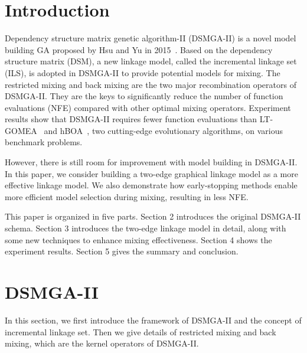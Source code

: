 \documentclass{sig-alternate-05-2015}
\begin{document}
%
%

%
%
\printccsdesc


\section{Introduction}

Dependency structure matrix genetic algorithm-II (DSMGA-II) is a novel model building GA proposed by Hsu and Yu in 2015~\cite{hsu:DSMGA2}.
Based on the dependency structure matrix (DSM), a new linkage model, called the incremental linkage set (ILS), is adopted in DSMGA-II to provide potential models for mixing. The restricted mixing and back mixing are the two major recombination operators of DSMGA-II. They are the keys to significantly reduce the number of function evaluations (NFE) compared with other optimal mixing operators. Experiment results show that DSMGA-II requires fewer function evaluations  than  LT-GOMEA~\cite{bosman:LT-GOMEA} and hBOA~\cite{pelikan:hBOA}, two cutting-edge evolutionary algorithms, on various benchmark problems. 

However, there is still room for improvement with model building in DSMGA-II. In this paper, we consider building a two-edge graphical linkage model as a more effective linkage model. We also demonstrate how early-stopping methods enable more efficient model selection during mixing, resulting in less NFE.


This paper is organized in five parts. Section 2 introduces the original DSMGA-II schema. Section 3 introduces the two-edge linkage model in detail, along with some new techniques to enhance mixing effectiveness. Section 4 shows the experiment results. Section 5 gives the summary and conclusion.



\section{DSMGA-II}
In this section, we first introduce the framework of DSMGA-II and the concept of incremental linkage set. Then we give details of restricted mixing and back mixing, which are the kernel operators of DSMGA-II.
\end{document}
